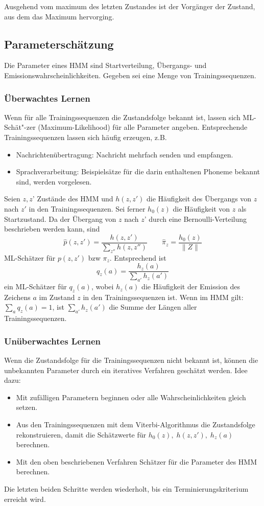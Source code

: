 Ausgehend vom maximum des letzten Zustandes ist der Vorgänger der Zustand, aus dem das Maximum hervorging.

\subsection{Parameterschätzung}
Die Parameter eines HMM sind Startverteilung, Übergangs- und Emissionswahrscheinlichkeiten.
Gegeben sei eine Menge von Trainingssequenzen.

\subsubsection{Überwachtes Lernen}
Wenn für alle Trainingssequenzen die Zustandsfolge bekannt ist, lassen sich ML-Schät"-zer (Maximum-Likelihood) für alle Parameter angeben.
Entsprechende Trainingssequenzen lassen sich häufig erzeugen, z.B.
\begin{itemize}
	\item Nachrichtenübertragung: Nachricht mehrfach senden und empfangen.
	\item Sprachverarbeitung: Beispielsätze für die darin enthaltenen Phoneme bekannt sind, werden vorgelesen.
\end{itemize}
Seien \(z,z\)' Zustände des HMM und \(h(z,z')\) die Häufigkeit des Übergangs von \(z\) nach \(z'\) in den Trainingssequenzen.
Sei ferner \(h_0(z)\) die Häufigkeit von \(z\) als Startzustand.
Da der Übergang von \(z\) nach \(z\)' durch eine Bernoulli-Verteilung beschrieben werden kann, sind
\[
	\hat{p}(z,z')=\frac{h(z,z')}{\sum\limits_{z''} h(z,z'')} \qquad
	\hat\pi_z=\frac{h_0(z)}{\|Z\|}
\]
ML-Schätzer für \(p(z,z')\) bzw \(\pi_z\).
Entsprechend ist
\[
	\hat{q}_z(a)=\frac{h_z(a)}{\sum\limits_{a'} h_z(a')}
\]
ein ML-Schätzer für \(q_z(a)\), wobei \(h_z(a)\) die Häufigkeit der Emission des Zeichens \(a\) im Zustand \(z\) in den Trainingssequenzen ist.
Wenn im HMM gilt: \(\sum_a q_z(a)=1\), ist \(\sum_{a'} h_z(a')\) die Summe der Längen aller Trainingssequenzen.

\subsubsection{Unüberwachtes Lernen}
Wenn die Zustandsfolge für die Trainingssequenzen nicht bekannt ist, können die unbekannten Parameter durch ein iteratives Verfahren geschätzt werden.
Idee dazu:
\begin{itemize}
	\item Mit zufälligen Parametern beginnen oder alle Wahrscheinlichkeiten gleich setzen.
	\item Aus den Trainingssequenzen mit dem Viterbi-Algorithmus die Zustandsfolge rekonstruieren, damit die Schätzwerte für \(h_0(z),\; h(z,z'),\; h_z(a)\) berechnen.
	\item Mit den oben beschriebenen Verfahren Schätzer für die Parameter des HMM berechnen.
\end{itemize}
Die letzten beiden Schritte werden wiederholt, bis ein Terminierungskriterium erreicht wird.

